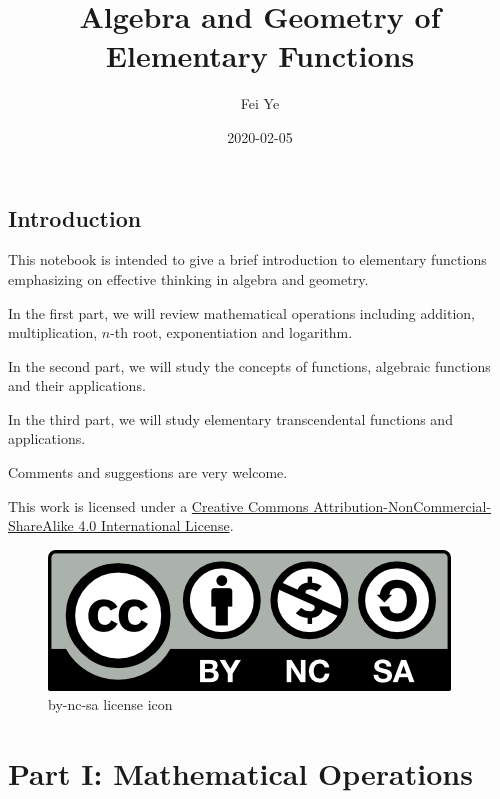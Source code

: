 \documentclass[en,12pt]{elegantbook}
\title{Algebra and Geometry of Elementary Functions}
\author{Fei Ye}
\date{2020-02-05}
\begin{document}

{
\setcounter{tocdepth}{1}
\tableofcontents
}
\hypertarget{introduction}{%
\chapter*{Introduction}\label{introduction}}

This notebook is intended to give a brief introduction to elementary functions emphasizing on effective thinking in algebra and geometry.

In the first part, we will review mathematical operations including addition, multiplication, \(n\)-th root, exponentiation and logarithm.

In the second part, we will study the concepts of functions, algebraic functions and their applications.

In the third part, we will study elementary transcendental functions and applications.

Comments and suggestions are very welcome.

This work is licensed under a \href{https://creativecommons.org/licenses/by-nc-sa/4.0/}{Creative Commons Attribution-NonCommercial-ShareAlike 4.0 International License}.

\begin{figure}
\centering
\includegraphics{figs/by-nc-sa.png}
\caption{by-nc-sa license icon}
\end{figure}

\hypertarget{part-part-i-mathematical-operations}{%
\part*{Part I: Mathematical Operations}\label{part-part-i-mathematical-operations}}
\end{document}
